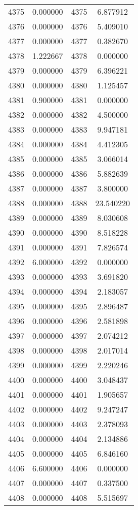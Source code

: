 \documentclass[12pt]{article}
\begin{document}
\begin{longtable}{@{}cccc@{}}
4375 & 0.000000 & 4375 & 6.877912 \\
4376 & 0.000000 & 4376 & 5.409010 \\
4377 & 0.000000 & 4377 & 0.382670 \\
4378 & 1.222667 & 4378 & 0.000000 \\
4379 & 0.000000 & 4379 & 6.396221 \\
4380 & 0.000000 & 4380 & 1.125457 \\
4381 & 0.900000 & 4381 & 0.000000 \\
4382 & 0.000000 & 4382 & 4.500000 \\
4383 & 0.000000 & 4383 & 9.947181 \\
4384 & 0.000000 & 4384 & 4.412305 \\
4385 & 0.000000 & 4385 & 3.066014 \\
4386 & 0.000000 & 4386 & 5.882639 \\
4387 & 0.000000 & 4387 & 3.800000 \\
4388 & 0.000000 & 4388 & 23.540220 \\
4389 & 0.000000 & 4389 & 8.030608 \\
4390 & 0.000000 & 4390 & 8.518228 \\
4391 & 0.000000 & 4391 & 7.826574 \\
4392 & 6.000000 & 4392 & 0.000000 \\
4393 & 0.000000 & 4393 & 3.691820 \\
4394 & 0.000000 & 4394 & 2.183057 \\
4395 & 0.000000 & 4395 & 2.896487 \\
4396 & 0.000000 & 4396 & 2.581898 \\
4397 & 0.000000 & 4397 & 2.074212 \\
4398 & 0.000000 & 4398 & 2.017014 \\
4399 & 0.000000 & 4399 & 2.220246 \\
4400 & 0.000000 & 4400 & 3.048437 \\
4401 & 0.000000 & 4401 & 1.905657 \\
4402 & 0.000000 & 4402 & 9.247247 \\
4403 & 0.000000 & 4403 & 2.378093 \\
4404 & 0.000000 & 4404 & 2.134886 \\
4405 & 0.000000 & 4405 & 6.846160 \\
4406 & 6.600000 & 4406 & 0.000000 \\
4407 & 0.000000 & 4407 & 0.337500 \\
4408 & 0.000000 & 4408 & 5.515697 \\

\end{longtable}
\end{document}
